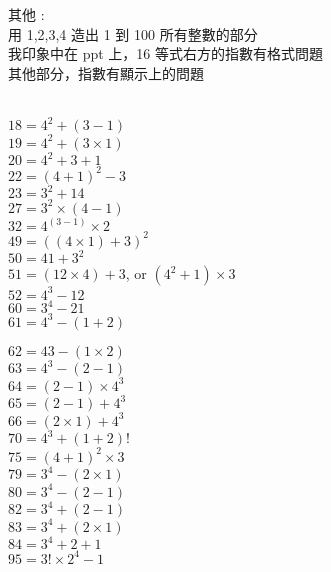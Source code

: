 \documentclass[12pt]{book}
\begin{document}
\begin{CJK}{UTF8}{bsmi}
其他 : \\
用 1,2,3,4 造出 1 到 100 所有整數的部分 \\
我印象中在 ppt 上，16 等式右方的指數有格式問題 \\
其他部分，指數有顯示上的問題 \\\\
\begin{minipage}{18em}
$18 = 4^2+(3-1)$ \\
$19 = 4^2+(3\times1)$ \\
$20 = 4^2+3+1$ \\
$22 = (4+1)^2-3$ \\
$23 = 3^2+14$ \\
$27 = 3^2\times(4-1)$ \\
$32 = 4^{(3-1)}\times2$ \\
$49 = ((4\times1)+3)^2$ \\
$50 = 41+3^2$ \\
$51 = (12\times4)+3$, or $(4^2+1)\times3$ \\
$52 = 4^3-12$ \\
$60 = 3^4-21$ \\
$61 = 4^3-(1+2)$
\end{minipage}
\begin{minipage}{\dimexpr\linewidth}
$62 = 43-(1\times2)$ \\
$63 = 4^3-(2-1)$ \\
$64 = (2-1)\times4^3$ \\
$65 = (2-1)+4^3$ \\
$66 = (2\times1)+4^3$ \\
$70 = 4^3+(1+2)!$ \\
$75 = (4+1)^2\times3$ \\
$79 = 3^4-(2\times1)$ \\
$80 = 3^4-(2-1)$ \\
$82 = 3^4+(2-1)$ \\
$83 = 3^4+(2\times 1)$ \\
$84 = 3^4+2+1$ \\
$95 = 3!\times2^4-1$
\end{minipage}

\end{CJK}
\end{document}
